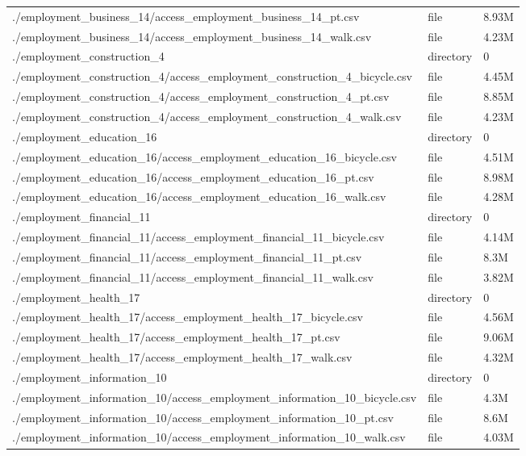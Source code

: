 \documentclass{article}
\begin{document}
\begin{longtable}[t]{>{\raggedright\arraybackslash}p{13cm}ll}
./employment\_business\_14/access\_employment\_business\_14\_pt.csv & file & 8.93M\\
./employment\_business\_14/access\_employment\_business\_14\_walk.csv & file & 4.23M\\
\addlinespace
./employment\_construction\_4 & directory & 0\\
./employment\_construction\_4/access\_employment\_construction\_4\_bicycle.csv & file & 4.45M\\
./employment\_construction\_4/access\_employment\_construction\_4\_pt.csv & file & 8.85M\\
./employment\_construction\_4/access\_employment\_construction\_4\_walk.csv & file & 4.23M\\
./employment\_education\_16 & directory & 0\\
\addlinespace
./employment\_education\_16/access\_employment\_education\_16\_bicycle.csv & file & 4.51M\\
./employment\_education\_16/access\_employment\_education\_16\_pt.csv & file & 8.98M\\
./employment\_education\_16/access\_employment\_education\_16\_walk.csv & file & 4.28M\\
./employment\_financial\_11 & directory & 0\\
./employment\_financial\_11/access\_employment\_financial\_11\_bicycle.csv & file & 4.14M\\
\addlinespace
./employment\_financial\_11/access\_employment\_financial\_11\_pt.csv & file & 8.3M\\
./employment\_financial\_11/access\_employment\_financial\_11\_walk.csv & file & 3.82M\\
./employment\_health\_17 & directory & 0\\
./employment\_health\_17/access\_employment\_health\_17\_bicycle.csv & file & 4.56M\\
./employment\_health\_17/access\_employment\_health\_17\_pt.csv & file & 9.06M\\
\addlinespace
./employment\_health\_17/access\_employment\_health\_17\_walk.csv & file & 4.32M\\
./employment\_information\_10 & directory & 0\\
./employment\_information\_10/access\_employment\_information\_10\_bicycle.csv & file & 4.3M\\
./employment\_information\_10/access\_employment\_information\_10\_pt.csv & file & 8.6M\\
./employment\_information\_10/access\_employment\_information\_10\_walk.csv & file & 4.03M\\

\end{longtable}
\end{document}
